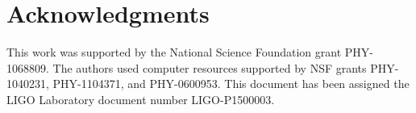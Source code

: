 


%
%

%
%



\section{Acknowledgments}

This work was supported by the National Science Foundation grant PHY-1068809. The authors used computer resources supported by NSF grants PHY-1040231, PHY-1104371, and PHY-0600953.
This document has been assigned the LIGO Laboratory document number LIGO-P1500003.

